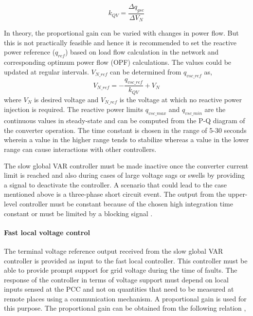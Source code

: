 \begin{equation}
    k_{QV} = \frac{\Delta q_{gsc}}{\Delta V_N}
\end{equation}

In theory, the proportional gain can be varied with changes in power flow. But this is not practically feasible and hence it is recommended to set the reactive power reference ($q_{ref}$) based on load flow calculation in the network and corresponding optimum power flow (OPF) calculations. The values could be updated at regular intervals. $V_{N\_{ref}}$ can be determined from $q_{vsc\_ref}$ as,
\begin{equation}
    V_{N\_{ref}} = -\frac{q_{vsc\_ref}}{k_{QV}} + V_N
\end{equation}
where $V_N$ is desired voltage and $V_{N\_{ref}}$ is the voltage at which no reactive power injection is required.
The reactive power limits $q_{vsc\_max}$ and $q_{vsc\_min}$ are the continuous values in steady-state and can be computed from the P-Q diagram of the converter operation. The time constant is chosen in the range of 5-30 seconds wherein a value in the higher range tends to stabilize whereas a value in the lower range can cause interactions with other controllers.

The slow global VAR controller must be made inactive once the converter current limit is reached and also during cases of large voltage sags or swells by providing a signal to deactivate the controller. A scenario that could lead to the case mentioned above is a three-phase short circuit event. The output from the upper-level controller must be constant because of the chosen high integration time constant or must be limited by a blocking signal \cite{korai_dynamic_2019}.

\paragraph{Fast local voltage control}
The terminal voltage reference output received from the slow global VAR controller is provided as input to the fast local controller. This controller must be able to provide prompt support for grid voltage during the time of faults. The response of the controller in terms of voltage support must depend on local inputs sensed at the \gls{PCC} and not on quantities that need to be measured at remote places using a communication mechanism. A proportional gain is used for this purpose. The proportional gain can be obtained from the following relation \cite{korai_dynamic_2019},

